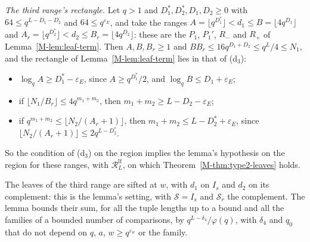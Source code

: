 \documentclass[11pt]{article}
\numberwithin{equation}{section}
\begin{document}
\emph{The third range's rectangle.} Let $q > 1$ and $D_1^*, D_2^*, D_1, D_2 \ge 0$ with $64 \le q^{L - D_1 - D_2}$ and
$64 \le q^{\varepsilon_E}$, and take the ranges $A = \lfloor q^{D_1^*} \rfloor < d_1 \le B = \lfloor 4q^{D_1} \rfloor$
and $A_r = \lfloor q^{D_2^*} \rfloor < d_2 \le B_r = \lfloor 4q^{D_2} \rfloor$: these are the $P_1$, $P_1'$, $R_-$ and
$R_+$ of Lemma~\ref{M-lem:leaf-term}. Then $A, B, B_r \ge 1$ and $BB_r \le 16q^{D_1 + D_2} \le q^L/4 \le N_1$, and the
rectangle of Lemma~\ref{M-lem:leaf-term} lies in that of (d$_3$):
\begin{itemize}
\item $\log_q A \ge D_1^* - \varepsilon_E$, since $A \ge q^{D_1^*}/2$, and $\log_q B \le D_1 + \varepsilon_E$;
\item if $\lfloor N_1/B_r \rfloor \le 4q^{m_1 + m_2}$, then $m_1 + m_2 \ge L - D_2 - \varepsilon_E$;
\item if $q^{m_1 + m_2} \le \lfloor N_2/(A_r + 1) \rfloor$, then $m_1 + m_2 \le L - D_2^* + \varepsilon_E$, since
  $\lfloor N_2/(A_r + 1) \rfloor \le 2q^{L - D_2^*}$.
\end{itemize}
So the condition of (d$_3$) on the region implies the lemma's hypothesis on the region for these ranges, with $\mathcal
R^{\mathrm{lf}}_L$, on which Theorem~\ref{M-thm:type2-leaves} holds.

The leaves of the third range are sifted at $w$, with $d_1$ on $I_s$ and $d_2$ on
its complement: this is the lemma's setting, with $\mathcal S = I_s$ and $\mathcal S_r$ the complement. The lemma bounds
their sum, for all the tuple lengths up to a bound and all the families of a bounded number of comparisons, by $q^{L -
\delta_4}/\varphi(q)$, with $\delta_4$ and $q_0$ that do not depend on $q$, $a$, $w \ge q^{\varepsilon_w}$ or the
family.
\end{document}
